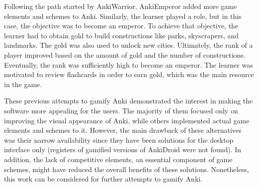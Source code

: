 Following the path started by AnkiWarrior, AnkiEmperor \citep{proxx2012emperor} added more game elements and schemes to Anki. Similarly, the learner played a role, but in this case, the objective was to become an emperor. To achieve that objective, the learner had to obtain gold to build constructions like parks, skyscrapers, and landmarks. The gold was also used to unlock new cities. Ultimately, the rank of a player improved based on the amount of gold and the number of constructions. Eventually, the rank was sufficiently high to become an emperor. The learner was motivated to review flashcards in order to earn gold, which was the main resource in the game.

These previous attempts to gamify Anki demonstrated the interest in making the software more appealing for the users. The majority of them focused only on improving the visual appearance of Anki, while others implemented actual game elements and schemes to it. However, the main drawback of these alternatives was their narrow availability since they have been solutions for the desktop interface only (registers of gamified versions of AnkiDroid were not found). In addition, the lack of competitive elements, an essential component of game schemes, might have reduced the overall benefits of these solutions. Nonetheless, this work can be considered for further attempts to gamify Anki.
